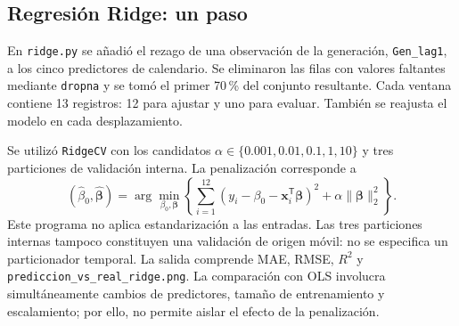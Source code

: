 \subsection{Regresión Ridge: un paso}

En \texttt{ridge.py} se añadió el rezago de una observación de la generación, \texttt{Gen\_lag1}, a los cinco predictores de calendario. Se eliminaron las filas con valores faltantes mediante \texttt{dropna} y se tomó el primer 70\,\% del conjunto resultante. Cada ventana contiene 13 registros: 12 para ajustar y uno para evaluar. También se reajusta el modelo en cada desplazamiento.

Se utilizó \texttt{RidgeCV} con los candidatos $\alpha\in\{0.001,0.01,0.1,1,10\}$ y tres particiones de validación interna. La penalización corresponde a
\begin{equation}
(\hat{\beta}_0,\hat{\boldsymbol{\beta}})
=\arg\min_{\beta_0,\boldsymbol{\beta}}
\left\{
\sum_{i=1}^{12}
\left(y_i-\beta_0-\boldsymbol{x}_i^{\mathsf T}\boldsymbol{\beta}\right)^2
+\alpha\|\boldsymbol{\beta}\|_2^2
\right\}.
\end{equation}
Este programa no aplica estandarización a las entradas. Las tres particiones internas tampoco constituyen una validación de origen móvil: no se especifica un particionador temporal. La salida comprende MAE, RMSE, $R^2$ y \texttt{prediccion\_vs\_real\_ridge.png}. La comparación con OLS involucra simultáneamente cambios de predictores, tamaño de entrenamiento y escalamiento; por ello, no permite aislar el efecto de la penalización.
